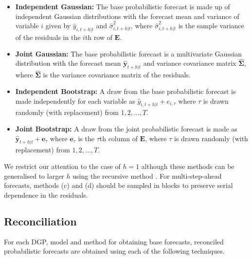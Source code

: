 \documentclass[11pt]{article}
\theoremstyle{definition}
\begin{document}
\begin{itemize}
	\item \textbf{Independent Gaussian:} The base probabilistic forecast is made up of independent Gaussian distributions with the forecast mean and variance of variable $i$ given by $\hat{y}_{i,t+h|t}$ and $\hat{\sigma}^2_{i,t+h|t}$, where $\hat{\sigma}^2_{i,t+h|t}$ is the sample variance of the residuals in the $i$th row of $\bm{E}$.
	\item \textbf{Joint Gaussian:} The base probabilistic forecast is a multivariate Gaussian distribution with the forecast mean $\hat{\bm{y}}_{t+h|t}$ and variance covariance matrix $\hat{\bm\Sigma}$, where $\hat{\bm\Sigma}$ is the variance covariance matrix of the residuals.
	\item \textbf{Independent Bootstrap:} A draw from the base probabilistic forecast is made independently for each variable as $\hat{y}_{i,t+h|t}+e_{i,\tau}$ where $\tau$ is drawn randomly (with replacement) from $1,2,\ldots, T$.
	\item \textbf{Joint Bootstrap:} A draw from the joint probabilistic forecast is made as $\hat{\bm{y}}_{t+h|t}+\bm{e}_{\tau}$ where $\bm{e}_{\tau}$ is the $\tau$th column of $\bm{E}$, where $\tau$ is drawn randomly (with replacement) from $1,2,\ldots, T$.
\end{itemize}

We restrict our attention to the case of $h=1$ although these methods can be generalised to larger $h$ using the recursive method \citep{FPP2018}. For multi-step-ahead forecasts, methods (c) and (d) should be sampled in blocks to preserve serial dependence in the residuals.

\subsection{Reconciliation}

For each DGP, model and method for obtaining base forecasts, reconciled probabilistic forecasts are obtained using each of the following techniques.
\end{document}
